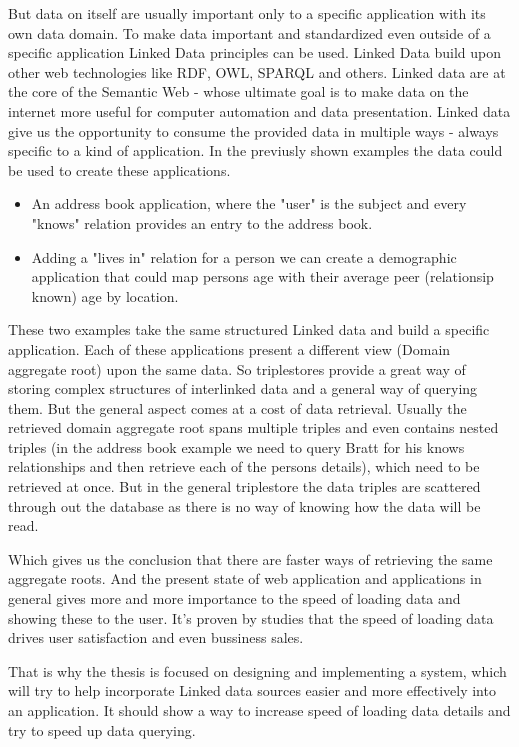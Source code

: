But data on itself are usually important only to a specific application with its own data domain. To make data important and standardized even outside of a specific application Linked Data principles can be used. Linked Data build upon other web technologies like RDF, OWL, SPARQL and others. Linked data are at the core of the Semantic Web - whose ultimate goal is to make data on the internet more useful for computer automation and data presentation. Linked data give us the opportunity to consume the provided data in multiple ways - always specific to a kind of application. 
In the previusly shown examples the data could be used to create these applications.
\begin{itemize}
	\item An address book application, where the "user" is the subject and every "knows" relation provides an entry to the address book. 
	\item Adding a "lives in" relation for a person we can create a demographic application that could map persons age with their average peer (relationsip known) age by location. 
\end{itemize}	
These two examples take the same structured Linked data and build a specific application. Each of these applications present a different view (Domain aggregate root) upon the same data.
So triplestores provide a great way of storing complex structures of interlinked data and a general way of querying them. But the general aspect comes at a cost of data retrieval. Usually the retrieved domain aggregate root spans multiple triples and even contains nested triples (in the address book example we need to query Bratt for his knows relationships and then retrieve each of the persons details), which need to be retrieved at once. But in the general triplestore the data triples are scattered through out the database as there is no way of knowing how the data will be read.

Which gives us the conclusion that there are faster ways of retrieving the same aggregate roots. And the present state of web application and applications in general gives more and more importance to the speed of loading data and showing these to the user. It's proven by studies \cite{onlineSixRevisionsSpeed, onlineWebSiteOptimizationSpeed} that the speed of loading data drives user satisfaction and even bussiness sales.

That is why the thesis is focused on designing and implementing a system, which will try to help incorporate Linked data sources easier and more effectively into an application. It should show a way to increase speed of loading data details and try to speed up data querying.